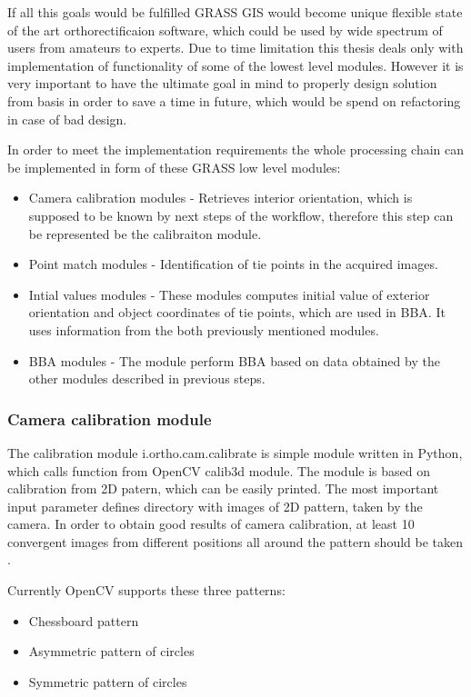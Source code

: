 \documentclass[a4paper,12pt]{article}
\begin{document}
If all this goals would be fulfilled GRASS GIS would become unique flexible state of the art orthorectificaion 
software, which could be used by wide spectrum of users from amateurs to experts.
Due to time limitation this thesis deals only with implementation of functionality of some of the lowest level modules. 
However it is very important to have 
the ultimate goal in mind to properly design solution from basis in order to save a time in future,
which would be spend on refactoring in case of bad design.

In order to meet the implementation requirements the whole processing chain can be implemented in form
of these GRASS low level modules:

\begin{itemize}
\item Camera calibration modules - Retrieves interior orientation, which is supposed to be known by 
next steps of the workflow, therefore this step can be represented be the calibraiton module.
\item Point match modules - Identification of tie points in the acquired images.
\item Intial values modules - These modules computes initial value of exterior orientation and 
object coordinates of tie points, which are used in BBA. It uses information from the both
previously mentioned modules.
\item BBA modules - The module perform BBA based on data obtained by the other modules described in previous steps.
\end{itemize}


\subsubsection{Camera calibration module}

The calibration module i.ortho.cam.calibrate is simple module written in Python, which calls
function from OpenCV calib3d module. The module is based on calibration from 2D patern, which can 
be easily printed. The most important input parameter defines directory with images of 2D pattern, 
taken by the camera. In order to obtain good results of camera calibration, at least 10 convergent images 
from different positions all around the pattern should be taken \cite{camera_calibration2013opencv}.

Currently OpenCV supports these three patterns:
\begin{itemize}
\item Chessboard pattern 
\item Asymmetric pattern of circles
\item Symmetric pattern of circles
\end{itemize}
\end{document}

